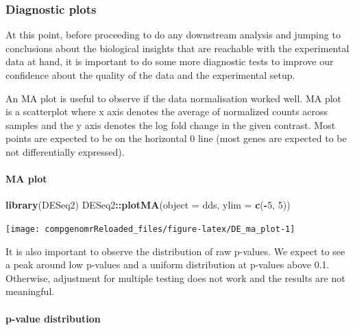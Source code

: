 \documentclass[12pt,]{krantz}
\newenvironment{Shaded}{\begin{snugshade}}{\end{snugshade}}
\newcommand{\DataTypeTok}[1]{\textcolor[rgb]{0.13,0.29,0.53}{#1}}
\newcommand{\DecValTok}[1]{\textcolor[rgb]{0.00,0.00,0.81}{#1}}
\newcommand{\KeywordTok}[1]{\textcolor[rgb]{0.13,0.29,0.53}{\textbf{#1}}}
\newcommand{\NormalTok}[1]{#1}
\newcommand{\OperatorTok}[1]{\textcolor[rgb]{0.81,0.36,0.00}{\textbf{#1}}}
\let\oldparagraph\paragraph
\renewcommand{\paragraph}[1]{\oldparagraph{#1}\mbox{}}
\begin{document}
\hypertarget{diagnostic-plots}{%
\subsubsection{Diagnostic plots}\label{diagnostic-plots}}

At this point, before proceeding to do any downstream analysis and jumping to conclusions about the biological insights that are reachable with the experimental data at hand, it is important to do some more diagnostic tests to improve our confidence about the quality of the data and the experimental setup.

An MA plot is useful to observe if the data normalisation worked well. MA plot is a scatterplot where x axis denotes the average of normalized counts across samples and the y axis denotes the log fold change in the given contrast. Most points are expected to be on the horizontal 0 line (most genes are expected to be not differentially expressed).

\hypertarget{ma-plot}{%
\paragraph{MA plot}\label{ma-plot}}

\begin{Shaded}
\begin{Highlighting}[]
\KeywordTok{library}\NormalTok{(DESeq2)}
\NormalTok{DESeq2}\OperatorTok{::}\KeywordTok{plotMA}\NormalTok{(}\DataTypeTok{object =}\NormalTok{ dds, }\DataTypeTok{ylim =} \KeywordTok{c}\NormalTok{(}\OperatorTok{-}\DecValTok{5}\NormalTok{, }\DecValTok{5}\NormalTok{))}
\end{Highlighting}
\end{Shaded}

\begin{center}\texttt{[image: compgenomrReloaded\_files/figure-latex/DE\_ma\_plot-1]} \end{center}

It is also important to observe the distribution of raw p-values. We expect to see a peak around low p-values and a uniform distribution at p-values above 0.1. Otherwise, adjustment for multiple testing does not work and the results are not meaningful.

\hypertarget{p-value-distribution}{%
\paragraph{p-value distribution}\label{p-value-distribution}}
\end{document}
